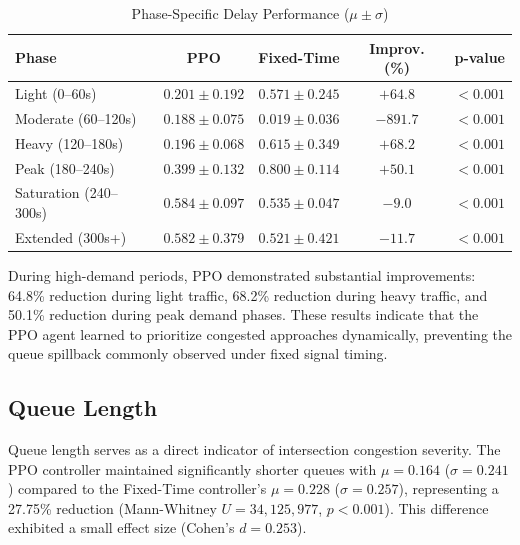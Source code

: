 \documentclass[11pt, a4paper]{report}
\begin{document}
\begin{table}[htbp]
\centering
\caption{Phase-Specific Delay Performance ($\mu \pm \sigma$)}
\label{tab:delay_phases2}
\begin{tabular}{lcccc}
\toprule
\textbf{Phase} & \textbf{PPO} & \textbf{Fixed-Time} & \textbf{Improv. (\%)} & \textbf{p-value} \\
\midrule
Light (0--60s) & $0.201 \pm 0.192$ & $0.571 \pm 0.245$ & $+64.8$ & $<0.001$ \\
Moderate (60--120s) & $0.188 \pm 0.075$ & $0.019 \pm 0.036$ & $-891.7$ & $<0.001$ \\
Heavy (120--180s) & $0.196 \pm 0.068$ & $0.615 \pm 0.349$ & $+68.2$ & $<0.001$ \\
Peak (180--240s) & $0.399 \pm 0.132$ & $0.800 \pm 0.114$ & $+50.1$ & $<0.001$ \\
Saturation (240--300s) & $0.584 \pm 0.097$ & $0.535 \pm 0.047$ & $-9.0$ & $<0.001$ \\
Extended (300s+) & $0.582 \pm 0.379$ & $0.521 \pm 0.421$ & $-11.7$ & $<0.001$ \\
\bottomrule
\end{tabular}
\end{table}

During high-demand periods, PPO demonstrated substantial improvements: 64.8\% reduction during light traffic, 68.2\% reduction during heavy traffic, and 50.1\% reduction during peak demand phases. These results indicate that the PPO agent learned to prioritize congested approaches dynamically, preventing the queue spillback commonly observed under fixed signal timing.

\subsection{Queue Length}

Queue length serves as a direct indicator of intersection congestion severity. The PPO controller maintained significantly shorter queues with $\mu = 0.164$ ($\sigma = 0.241$) compared to the Fixed-Time controller's $\mu = 0.228$ ($\sigma = 0.257$), representing a 27.75\% reduction (Mann-Whitney $U = 34,125,977$, $p < 0.001$). This difference exhibited a small effect size (Cohen's $d = 0.253$).
\end{document}
